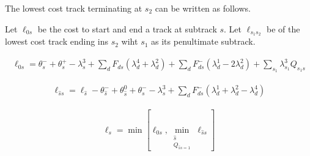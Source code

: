 \documentclass{article}
\begin{document}
The lowest cost track terminating at $s_2$ can be written as follows.  

Let $\ell_{0s}$ be the cost to start and end a track at subtrack $s$.  Let $\ell_{s_1s_2}$ be of the lowest cost track ending ins $s_2$ wiht $s_1$ as its penultimate subtrack.  

\begin{align}
\ell_{0s}=\theta^-_s+\theta^+_s-\lambda^3_s+\sum_{d}F_{ds}(\lambda^4_d+\lambda^2_d)+\sum_{d}F^-_{ds}(\lambda^1_d-2\lambda^2_d)+ \sum_{s_1} \lambda^3_{s_1}Q_{s_1s}
\end{align}

\begin{align}
\ell_{\hat{s}s}=\ell_{\hat{s}}-\theta^-_{\hat{s}}+\theta^0_{\hat{s}}+\theta^-_s-\lambda^3_s+\sum_{d}F^-_{ds}(\lambda^1_d+\lambda^2_d-\lambda^4_d) %
\end{align}

\begin{align}
\ell_s=\min [\ell_{0s},\min_{\substack{\hat{s} \\ Q_{\hat{s}s=1}}}\ell_{\hat{s}s}]
\end{align}


\end{document}
